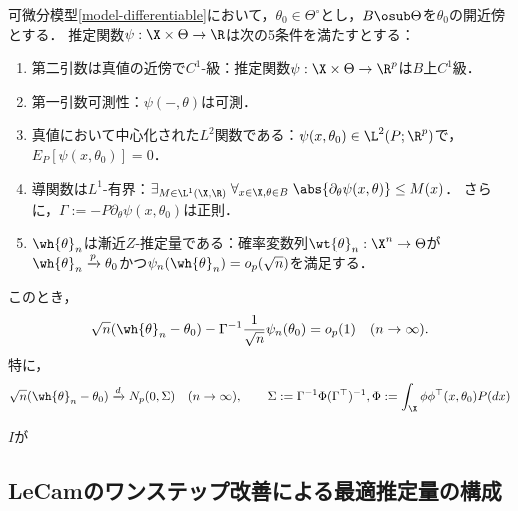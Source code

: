 \documentclass[uplatex,dvipdfmx]{jsreport}
\begin{document}
\begin{theorem}[漸近$Z$-推定量が漸近正規であるための十分条件]\label{thm-E-asymptotic-normality-for-Z-estimator}
    可微分模型\ref{model-differentiable}において，$\theta_0\in\Theta^\circ$とし，$B\osub\Theta$を$\theta_0$の開近傍とする．
    推定関数$\psi:\X\times\Theta\to\R$は次の5条件を満たすとする：
    \begin{enumerate}[({E}1)]
        \item 第二引数は真値の近傍で$C^1$-級：推定関数$\psi:\X\times\Theta\to\R^p$は$B$上$C^1$級．
        \item 第一引数可測性：$\psi(-,\theta)$は可測．
        \item 真値において中心化された$L^2$関数である：$\psi(x,\theta_0)\in\L^2(P;\R^p)$で，$E_P[\psi(x,\theta_0)]=0$．
        \item 導関数は$L^1$-有界：$\exists_{M\in\L^1(\X,\R)}\;\forall_{x\in\X,\theta\in B}\;\abs{\partial_\theta\psi(x,\theta)}\leq M(x)$．
        さらに，$\Gamma:=-P\partial_\theta\psi(x,\theta_0)$は正則．
        \item $\wh{\theta}_n$は漸近$Z$-推定量である：確率変数列$\wt{\theta}_n:\X^n\to\Theta$が$\wh{\theta}_n\xrightarrow{p}\theta_0$かつ$\psi_n(\wh{\theta}_n)=o_p(\sqrt{n})$を満足する．
    \end{enumerate}
    このとき，
    \[\sqrt{n}(\wh{\theta}_n-\theta_0)-\Gamma^{-1}\frac{1}{\sqrt{n}}\psi_n(\theta_0)=o_p(1)\quad(n\to\infty).\]
    特に，
    \[\sqrt{n}(\wh{\theta}_n-\theta_0)\xrightarrow{d}N_p(0,\Sigma)\quad(n\to\infty),\qquad\Sigma:=\Gamma^{-1}\Phi(\Gamma^{\top})^{-1},\Phi:=\int_\X\phi\phi^{\top}(x,\theta_0)P(dx)\]
\end{theorem}
\begin{remarks}
    $I$が
\end{remarks}

\subsection{LeCamのワンステップ改善による最適推定量の構成}
\end{document}
